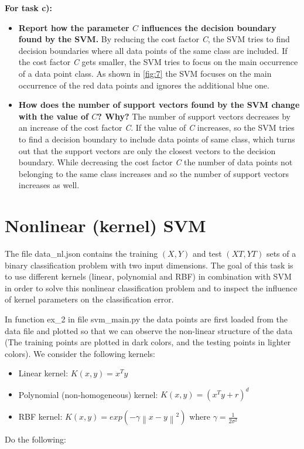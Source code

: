 \documentclass[a4paper]{article}
\newcommand\norm[1]{\left\lVert#1\right\rVert}
\begin{document}
\textbf{For task c):}
\begin{itemize}
  \item \textbf{Report how the parameter $C$ influences the decision boundary found by the SVM.}
  By reducing the cost factor \textit{C}, the SVM tries to find decision boundaries where all data points of the same class are included. If the cost factor \textit{C} gets smaller, the SVM tries to focus on the main occurrence of a data point class. As shown in \ref{fig:7} the SVM focuses on the main occurrence of the red data points and ignores the additional blue one.
  
\item \textbf{How does the number of support vectors found by the SVM change with the value of $C$? Why?}
The number of support vectors decreases by an increase of the cost factor \textit{C}. If the value of \textit{C} increases, so the SVM tries to find a decision boundary to include data points of same class, which turns out that the support vectors are only the closest vectors to the decision boundary. While decreasing the cost factor \textit{C} the number of data points not belonging to the same class increases and so the number of support vectors increases as well.
\end{itemize}

\newpage

\section{Nonlinear (kernel) SVM}

The file data\_nl.json contains the training $(X, Y )$ and test $(XT, Y T)$ sets of a binary classification problem with two input dimensions. The goal of this task is to use different kernels (linear, polynomial and RBF) in combination with SVM in order to solve this nonlinear classification problem and to inspect the influence of kernel parameters on the classification error.

In function ex\_2 in file svm\_main.py the data points are first loaded from the data file and plotted so that we can observe the non-linear structure of the data (The training points are plotted in dark colors, and the testing points in lighter colors).\newline
We consider the following kernels:

\begin{itemize}
\item Linear kernel: $K(x, y) = x^T y$
\item Polynomial (non-homogeneous) kernel: $K(x, y) = (x^T y + r)^d$
\item RBF kernel: $ K(x, y) = exp(−\gamma\norm{x − y}^2)$ where $\gamma =\frac{1}{2\sigma^2}$
\end{itemize}
Do the following: \newline
\end{document}
